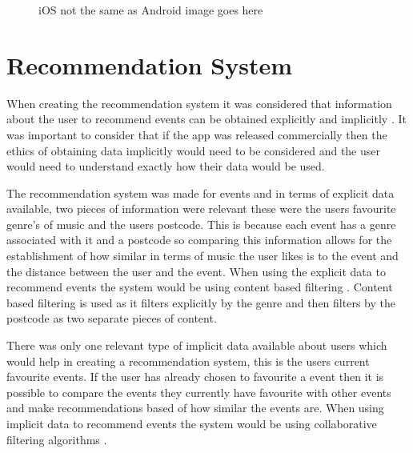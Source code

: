 \begin{figure} [H]
\caption{iOS not the same as Android image goes here}
\end{figure}


\section{Recommendation System}
When creating the recommendation system it was considered that information about the user to recommend events can be obtained explicitly and implicitly \cite{ML}. It was important to consider that if the app was released commercially then the ethics of obtaining data implicitly would need to be considered and the user would need to understand exactly how their data would be used.

The recommendation system was made for events and in terms of explicit data available, two pieces of information were relevant these were the users favourite genre's of music and the users postcode. This is because each event has a genre associated with it and a postcode so comparing this information allows for the establishment of how similar in terms of music the user likes is to the event and the distance between the user and the event. When using the explicit data to recommend events the system would be using content based filtering \cite{san}. Content based filtering is used as it filters explicitly by the genre and then filters by the postcode as two separate pieces of content.

There was only one relevant type of implicit data available about users which would help in creating a recommendation system, this is the users current favourite events. If the user has already chosen to favourite a event then it is possible to compare the events they currently have favourite with other events and make recommendations based of how similar the events are. When using implicit data to recommend events the system would be using collaborative filtering algorithms \cite{collab}.


